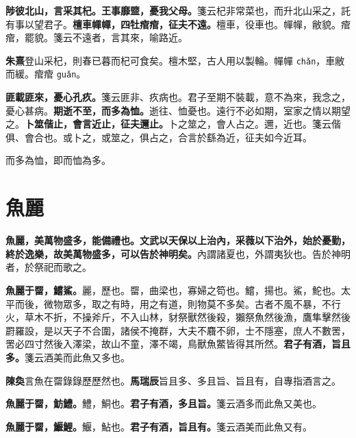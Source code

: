 \textbf{陟彼北山，言采其杞。王事靡盬，憂我父母。}{\footnotesize 箋云杞非常菜也，而升北山采之，託有事以望君子。}\textbf{檀車幝幝，四牡痯痯，征夫不遠。}{\footnotesize 檀車，役車也。幝幝，敝貌。痯痯，罷貌。箋云不遠者，言其來，喻路近。}

\begin{quoting}\textbf{朱熹}登山采杞，則春已暮而杞可食矣。檀木堅，古人用以製輪。幝幝 \texttt{chǎn}，車敝而緩。痯痯 \texttt{guǎn}。\end{quoting}

\textbf{匪載匪來，憂心孔疚。}{\footnotesize 箋云匪非、疚病也。君子至期不裝載，意不為來，我念之，憂心甚病。}\textbf{期逝不至，而多為恤。}{\footnotesize 逝往、恤憂也。遠行不必如期，室家之情以期望之。}\textbf{卜筮偕止，會言近止，征夫邇止。}{\footnotesize 卜之筮之，會人占之。邇，近也。箋云偕俱、會合也。或卜之，或筮之，俱占之，合言於繇為近，征夫如今近耳。}

\begin{quoting}而多為恤，即而恤為多。\end{quoting}

\section{魚麗}


\textbf{魚麗，美萬物盛多，能備禮也。文武以天保以上治內，采薇以下治外，始於憂勤，終於逸樂，故美萬物盛多，可以告於神明矣。}{\footnotesize 內謂諸夏也，外謂夷狄也。告於神明者，於祭祀而歌之。}

\textbf{魚麗于罶，鱨鯊。}{\footnotesize 麗，歷也。罶，曲梁也，寡婦之笱也。鱨，揚也。鯊，鮀也。太平而後，微物眾多，取之有時，用之有道，則物莫不多矣。古者不風不暴，不行火，草木不折，不操斧斤，不入山林，豺祭獸然後殺，獺祭魚然後漁，鷹隼擊然後罻羅設，是以天子不合圍，諸侯不掩群，大夫不麛不卵，士不隱塞，庶人不數罟，罟必四寸然後入澤梁，故山不童，澤不竭，鳥獸魚鱉皆得其所然。}\textbf{君子有酒，旨且多。}{\footnotesize 箋云酒美而此魚又多也。}

\begin{quoting}\textbf{陳奐}言魚在罶錄錄歷歷然也。\textbf{馬瑞辰}旨且多、多且旨、旨且有，自專指酒言之。\end{quoting}

\textbf{魚麗于罶，魴鱧。}{\footnotesize 鱧，鮦也。}\textbf{君子有酒，多且旨。}{\footnotesize 箋云酒多而此魚又美也。}

\textbf{魚麗于罶，鰋鯉。}{\footnotesize 鰋，鮎也。}\textbf{君子有酒，旨且有。}{\footnotesize 箋云酒美而此魚又有。}

